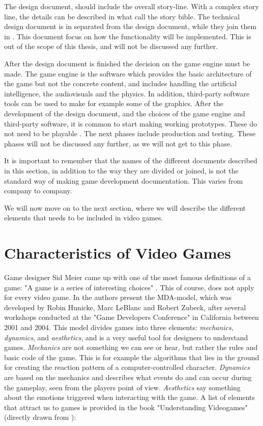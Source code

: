 The design document, should include the overall story-line. With a complex story line, the details can be described in what \cite{gamedesign} call the story bible.  The technical design document is in \cite{gamedesign} separated from the design document, while they join them in \cite{understandingvg}. This document focus on how the functionality will be implemented. This is out of the scope of this thesis, and will not be discussed any further. 

After the design document is finished the decision on the game engine must be made. The game engine is the software which provides the basic architecture of the game but not the concrete content, and includes handling the artificial intelligence, the audiovisuals and the physics. In addition, third-party software tools can be used to make for example some of the graphics. After the development of the design document, and the choices of the game engine and third-party software, it is common to start making working prototypes. These do not need to be playable \cite{understandingvg}. The next phases include production and testing. These phases will not be discussed any further, as we will not get to this phase. 

It is important to remember that the names of the different documents described in this section, in addition to the way they are divided or joined, is not the standard way of making game development documentation. This varies from company to company. 

We will now move on to the next section, where we will describe the different elements that needs to be included in video games.

\section{Characteristics of Video Games}

Game designer Sid Meier came up with one of the most famous definitions of a game: "A game is a series of interesting choices" \cite{understandingvg}. This of course, does not apply for every video game. In \cite{understandingvg} the authors present the MDA-model, which was developed by Robin Hunicke, Marc LeBlanc and Robert Zubeck, after several workshops conducted at the "Game Developers Conference" in California between 2001 and 2004. This model divides games into three elements: \emph{mechanics}, \emph{dynamics}, and \emph{aesthetics}, and is a very useful tool for designers to understand games. \emph{Mechanics} are not something we can see or hear, but rather the rules and basic code of the game. This is for example the algorithms that lies in the ground for creating the reaction pattern of a computer-controlled character. \emph{Dynamics} are based on the mechanics and describes what events do and can occur during the gameplay, seen from the players point of view. \emph{Aesthetics} say something about the emotions triggered when interacting with the game. A list of elements  that attract us to games is provided in the book "Understanding Videogames" (directly drawn from \cite{understandingvg}): 

